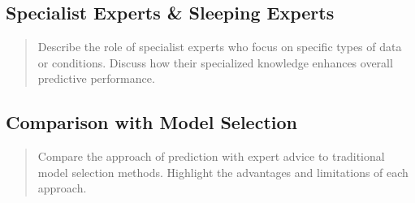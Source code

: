 \documentclass[11pt]{article} %
\theoremstyle{plain}
\theoremstyle{definition}
\begin{document}
\subsection{Specialist Experts \& Sleeping Experts}
\begin{quote}
  Describe the role of specialist experts who focus on specific types of data or conditions. Discuss how their specialized knowledge enhances overall predictive performance.
\end{quote}

\subsection{Comparison with Model Selection}
\begin{quote}
  Compare the approach of prediction with expert advice to traditional model selection methods. Highlight the advantages and limitations of each approach.
\end{quote}

\newpage



\end{document}
